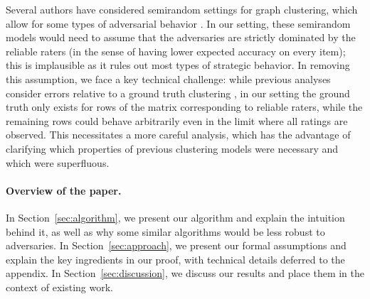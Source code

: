 Several authors have considered semirandom settings for graph clustering, which 
allow for some types of adversarial behavior \citep{feige2000finding,
feige2001heuristics,coja2004coloring,krivelevich2006semirandom,
coja2007solving,makarychev2012approximation,chen2014improved,guedon2014community,
moitra2015robust,agarwal2015multisection}. 
In our setting, these semirandom models would need to assume that the adversaries 
are strictly dominated by the reliable raters (in the sense of having lower 
expected accuracy on every item); this is implausible as it rules out 
most types of strategic behavior.
In removing this assumption, we face a key technical challenge: while previous 
analyses consider errors relative to a ground truth clustering 
\citep[e.g.][]{chen2014improved}, in our setting 
the ground truth only exists for rows of the matrix corresponding to reliable 
raters, while the remaining rows could behave arbitrarily even in the limit 
where all ratings are observed. This necessitates a more careful analysis, 
which has the advantage of clarifying which properties of previous clustering 
models were necessary and which were superfluous.


\paragraph{Overview of the paper.} In Section~\ref{sec:algorithm}, we 
present our algorithm and explain the intuition behind it, as well as why 
some similar algorithms would be less robust to adversaries. In 
Section~\ref{sec:approach}, we present our formal assumptions and explain 
the key ingredients in our proof, with technical details deferred to the 
appendix. In Section~\ref{sec:discussion}, we discuss our results and 
place them in the context of existing work.
